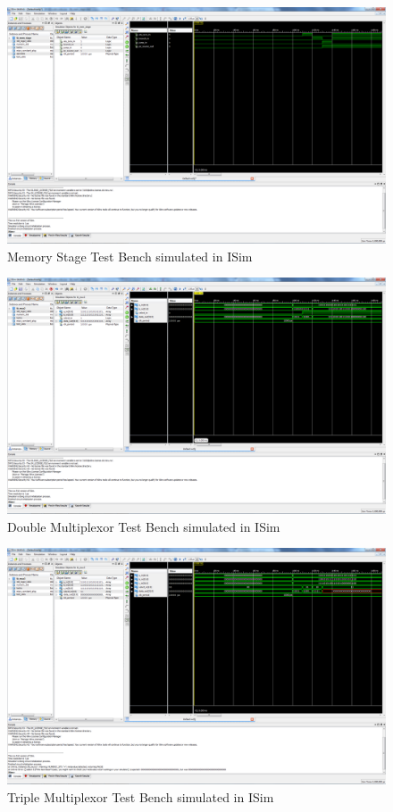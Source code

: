 \begin{figure}
    \includegraphics[width=\textwidth]{illustrations/tb_mem_stage.PNG}
    \caption{Memory Stage Test Bench simulated in ISim}
\end{figure}

\begin{figure}
    \includegraphics[width=\textwidth]{illustrations/tb_mux2.PNG}
    \caption{Double Multiplexor Test Bench simulated in ISim}
\end{figure}

\begin{figure}
    \includegraphics[width=\textwidth]{illustrations/tb_mux3.PNG}
    \caption{Triple Multiplexor Test Bench simulated in ISim}
\end{figure}

